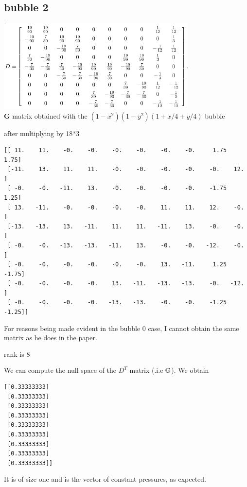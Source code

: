 \subsection*{bubble 2}

\begin{center}
\includegraphics[width=10cm]{python_codes/fieldstone_72/images/mat3}\\
{\captionfont ${\bm G}$ matrix obtained with the $(1-x^2)(1-y^2)(1+x/4+y/4)$ bubble}
\end{center}

after multiplying by 18*3
\begin{verbatim}
[[ 11.    11.    -0.    -0.    -0.    -0.    -0.    -0.     1.75   1.75]
 [-11.    13.    11.    11.    -0.    -0.    -0.    -0.    -0.    12.  ]
 [ -0.    -0.   -11.    13.    -0.    -0.    -0.    -0.    -1.75   1.25]
 [ 13.   -11.    -0.    -0.    -0.    -0.    11.    11.    12.    -0.  ]
 [-13.   -13.    13.   -11.    11.    11.   -11.    13.    -0.    -0.  ]
 [ -0.    -0.   -13.   -13.   -11.    13.    -0.    -0.   -12.    -0.  ]
 [ -0.    -0.    -0.    -0.    -0.    -0.    13.   -11.     1.25  -1.75]
 [ -0.    -0.    -0.    -0.    13.   -11.   -13.   -13.    -0.   -12.  ]
 [ -0.    -0.    -0.    -0.   -13.   -13.    -0.    -0.    -1.25  -1.25]]
\end{verbatim}

For reasons being made evident in the bubble 0 case, I cannot obtain the same 
matrix as he does in the paper. 

rank is 8

We can compute the null space of the $D^T$ matrix (.i.e ${\mathbb{G}}$).
We obtain
\begin{verbatim}
[[0.33333333]
 [0.33333333]
 [0.33333333]
 [0.33333333]
 [0.33333333]
 [0.33333333]
 [0.33333333]
 [0.33333333]
 [0.33333333]]
\end{verbatim}
It is of size one and is the vector of constant pressures, as expected.




\newpage
